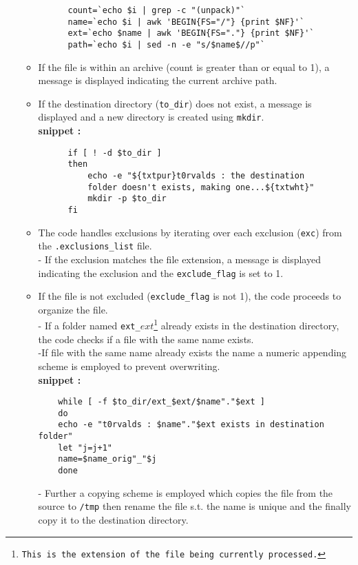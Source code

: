 \documentclass[12pt]{article}
\begin{document}
\begin{flushleft}
\begin{enumerate}
\begin{itemize}
\begin{verbatim}
      count=`echo $i | grep -c "(unpack)"`
      name=`echo $i | awk 'BEGIN{FS="/"} {print $NF}'`
      ext=`echo $name | awk 'BEGIN{FS="."} {print $NF}'`
      path=`echo $i | sed -n -e "s/$name$//p"`
      \end{verbatim}
            \item If the file is within an archive (count is greater than or equal to 1), a message is displayed indicating the current archive path.
            \item If the destination directory (\texttt{to\_dir}) does not exist, a message is displayed and a new directory is created using \texttt{mkdir}.
      \\\textbf{snippet :}
      \begin{verbatim}
      if [ ! -d $to_dir ]
      then
          echo -e "${txtpur}t0rvalds : the destination 
          folder doesn't exists, making one...${txtwht}"
          mkdir -p $to_dir
      fi
      \end{verbatim}       
            \item The code handles exclusions by iterating over each exclusion (\texttt{exc}) from the \texttt{.exclusions\_list} file.
                \\- If the exclusion matches the file extension, a message is displayed indicating the exclusion and the \texttt{exclude\_flag} is set to 1.
            \item If the file is not excluded (\texttt{exclude\_flag} is not 1), the code proceeds to organize the file.
                \\- If a folder named \texttt{ext\_$ext$\footnote{This is the extension of the file being currently processed.}} already exists in the destination directory, the code checks if a file with the same name exists.
                    \\-If file with the same name already exists the name a numeric appending scheme is employed to prevent overwriting.
            \\\textbf{snippet :}
    \begin{verbatim}
    while [ -f $to_dir/ext_$ext/$name"."$ext ]
    do
    echo -e "t0rvalds : $name"."$ext exists in destination folder"
    let "j=j+1"
    name=$name_orig"_"$j
    done
    \end{verbatim}
                - Further a copying scheme is employed which copies the file from the source to \texttt{/tmp}
                then rename the file s.t. the name is unique and the finally copy it to the destination directory.

\end{itemize}
\end{enumerate}
\end{flushleft}
\end{document}
